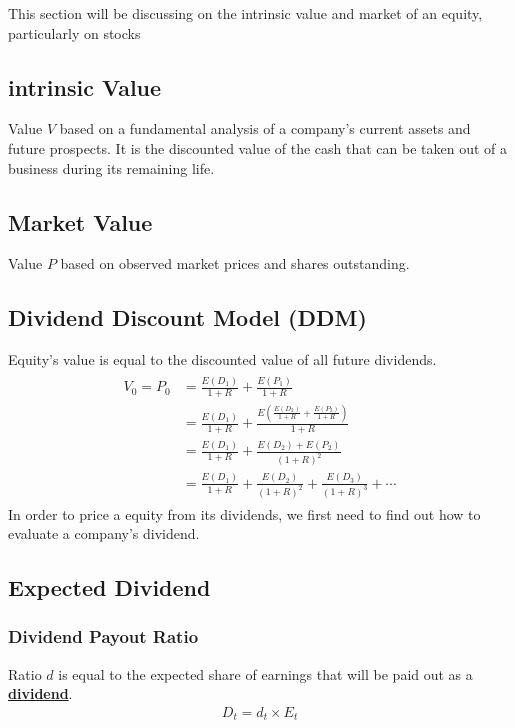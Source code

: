 This section will be discussing on the intrinsic value and market of an equity, particularly on stocks 

\begin{multicols}{2}
    
\subsection{intrinsic Value}
Value $V$ based on a fundamental analysis of a company's current assets and future prospects. It is the discounted value of the cash that can be taken out of a business during its remaining life. 

\subsection{Market Value}
Value $P$ based on observed market prices and shares outstanding.

\subsection{Dividend Discount Model (DDM)}
Equity's value is equal to the discounted value of all future dividends.
\begin{gather*}
    \begin{split}
        V_0 = P_0 &= \frac{E(D_1)}{1+R}+\frac{E(P_1)}{1+R}\\
        &= \frac{E(D_1)}{1+R} + \frac{E(\frac{E(D_2)}{1+R}+\frac{E(P_2)}{1+R})}{1+R}\\
        &= \frac{E(D_1)}{1+R}+\frac{E(D_2)+E(P_2)}{(1+R)^2}\\
        &= \frac{E(D_1)}{1+R} + \frac{E(D_2)}{(1+R)^2} + \frac{E(D_3)}{(1+R)^3} + \cdots
    \end{split}
\end{gather*}
In order to price a equity from its dividends, we first need to find out how to evaluate a company's dividend.

\subsection{Expected Dividend}
\subsubsection{Dividend Payout Ratio}
Ratio $d$ is equal to the expected share of earnings that will be paid out as a \underline{\textbf{dividend}}.
\begin{gather*}
    \boxed{D_t = d_t\times E_t}
\end{gather*}


\end{multicols}
